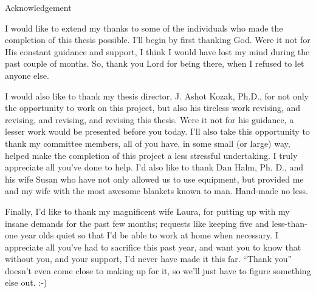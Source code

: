 \documentclass[12pt]{report}
\begin{document}


\begin{singlespace}
\tableofcontents
\listoffigures
\listoftables
\end{singlespace}

\newpage
\thispagestyle{plain}
\setlength{\parindent}{0em}
\begin{center}
{\huge Acknowledgement}
\end{center}

I would like to extend my thanks to some of the individuals who made the completion of this thesis possible. I'll begin by first thanking God. Were it not for His constant guidance and support, I think I would have lost my mind during the past couple of months. So, thank you Lord for being there, when I refused to let anyone else.

I would also like to thank my thesis director, J. Ashot Kozak, Ph.D., for not only the opportunity to work on this project, but also his tireless work revising, and revising, and revising, and revising this thesis. Were it not for his guidance, a lesser work would be presented before you today. 
I'll also take this opportunity to thank my committee members, all of you have, in some small (or large) way, helped make the completion of this project a less stressful undertaking. I truly appreciate all you've done to help. I'd also like to thank Dan Halm, Ph. D., and his wife Susan who have not only allowed us to use equipment, but provided me and my wife with the most awesome blankets known to man. Hand-made no less.   

Finally, I'd like to thank my magnificent wife Laura, for putting up with my insane demands for the past few months; requests like keeping five and less-than-one year olds quiet so that I'd be able to work at home when necessary. I appreciate all you've had to sacrifice this past year, and want you to know that without you, and your support, I'd never have made it this far. ``Thank you'' doesn't even come close to making up for it, so we'll just have to figure something else out. :-)
\end{document}
